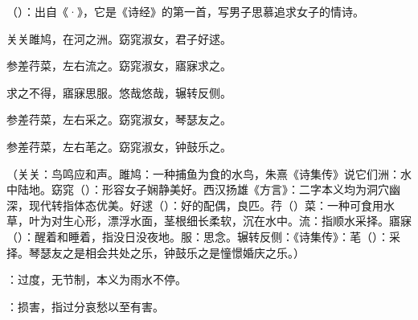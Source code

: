 {
\item {}（）：出自《·》，它是《诗经》的第一首，写男子思慕追求女子的情诗。
\begin{lyquotepoem}
关关雎鸠，在河之洲。窈窕淑女，君子好逑。

参差荇菜，左右流之。窈窕淑女，寤寐求之。

求之不得，寤寐思服。悠哉悠哉，辗转反侧。

参差荇菜，左右采之。窈窕淑女，琴瑟友之。

参差荇菜，左右芼之。窈窕淑女，钟鼓乐之。
\end{lyquotepoem}
（关关：鸟鸣应和声。雎鸠：一种捕鱼为食的水鸟，朱熹《诗集传》说它们洲：水中陆地。窈窕（）：形容女子娴静美好。西汉扬雄《方言》：二字本义均为洞穴幽深，现代转指体态优美。好逑（）：好的配偶，良匹。荇（）菜：一种可食用水草，叶为对生心形，漂浮水面，茎根细长柔软，沉在水中。流：指顺水采择。寤寐（）：醒着和睡着，指没日没夜地。服：思念。辗转反侧：《诗集传》：芼（）：采择。琴瑟友之是相会共处之乐，钟鼓乐之是憧憬婚庆之乐。）

\item {}：过度，无节制，本义为雨水不停。

：损害，指过分哀愁以至有害。

}
{}


